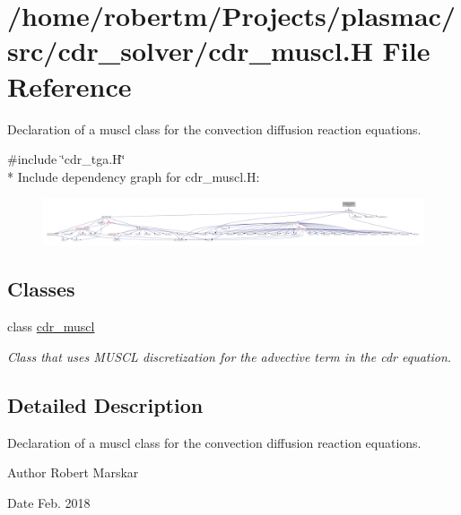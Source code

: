 \hypertarget{cdr__muscl_8H}{}\section{/home/robertm/\+Projects/plasmac/src/cdr\+\_\+solver/cdr\+\_\+muscl.H File Reference}
\label{cdr__muscl_8H}


Declaration of a muscl class for the convection diffusion reaction equations.  


{\ttfamily \#include \char`\"{}cdr\+\_\+tga.\+H\char`\"{}}\\*
Include dependency graph for cdr\+\_\+muscl.\+H\+:\nopagebreak
\begin{figure}[H]
\begin{center}
\leavevmode
\includegraphics[width=350pt]{cdr__muscl_8H__incl}
\end{center}
\end{figure}
\subsection*{Classes}
\begin{DoxyCompactItemize}
\item 
class \hyperlink{classcdr__muscl}{cdr\+\_\+muscl}
\begin{DoxyCompactList}\small\item\em Class that uses M\+U\+S\+CL discretization for the advective term in the cdr equation. \end{DoxyCompactList}\end{DoxyCompactItemize}


\subsection{Detailed Description}
Declaration of a muscl class for the convection diffusion reaction equations. 

\begin{DoxyAuthor}{Author}
Robert Marskar 
\end{DoxyAuthor}
\begin{DoxyDate}{Date}
Feb. 2018 
\end{DoxyDate}

